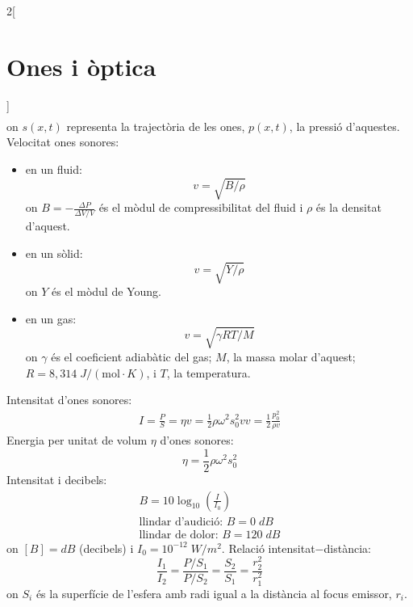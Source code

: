 \documentclass[../../../main.tex]{subfiles}
\begin{document}
\begin{multicols}{2}[\section{Ones i òptica}]
\begin{gather*}
\end{gather*}
{\footnotesize on $s(x,t)$ representa la trajectòria de les ones, $p(x,t)$, la pressió d'aquestes.}\newline
Velocitat ones sonores:
\begin{itemize}
    \item en un fluid: $$v=\sqrt{B/\rho}$$ {\footnotesize on $B=-\frac{\Delta P}{\Delta V/V}$ és el mòdul de com\-pres\-si\-bi\-li\-tat del fluid i $\rho$ és la densitat d'aquest.}
    \item en un sòlid:
     $$v=\sqrt{Y/\rho}$$ {\footnotesize on $Y$ és el mòdul de Young.}
    \item en un gas:
    $$v=\sqrt{\gamma RT/M}$$ {\footnotesize on $\gamma$ és el coeficient adiabàtic del gas; $M$, la massa molar d'aquest; $R=8,314\;J/(\text{mol}\cdot K)$, i $T$, la temperatura.}
\end{itemize}
Intensitat d'ones sonores:
\begin{gather*}
    I=\frac{P}{S}=\eta v=\frac{1}{2}\rho\omega^2s_0^2v v=\frac{1}{2}\frac{p_0^2}{\rho v}
\end{gather*}
Energia per unitat de volum $\eta$ d'ones sonores:
$$\eta=\frac{1}{2}\rho\omega^2s_0^2$$
Intensitat i decibels:
\begin{gather*}
    B=10\log_{10}\left(\frac{I}{I_0}\right)\\
    \text{llindar d'audició: }B= 0\;dB\\
    \text{llindar de dolor: }B= 120\;dB
\end{gather*}
{\footnotesize on $[B]=dB$ (decibels) i $I_0=10^{-12}\;W/m^2$.}
Relació intensitat$-$distància: $$\frac{I_1}{I_2}=\frac{P/S_1}{P/S_2}=\frac{S_2}{S_1}=\frac{r_2^2}{r_1^2}$$ {\footnotesize on $S_i$ és la superfície de l'esfera amb radi igual a la distància al focus emissor, $r_i$.}

\end{multicols}
\end{document}
